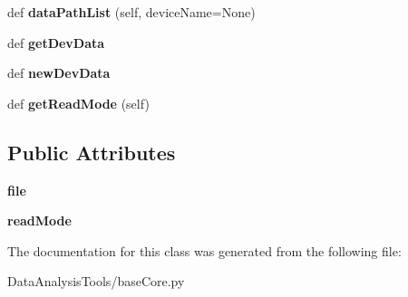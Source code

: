 \begin{DoxyCompactItemize}
def {\bfseries data\+Path\+List} (self, device\+Name=None)
\item 
\mbox{\label{classMIS_1_1DataAnalysisTools_1_1baseCore_1_1LUMISData_a1e463d053cda8f745f1fefe394a772c4}} 
def {\bfseries get\+Dev\+Data}
\item 
\mbox{\label{classMIS_1_1DataAnalysisTools_1_1baseCore_1_1LUMISData_a9e28f88167eb0230f6fe7286c44f43d2}} 
def {\bfseries new\+Dev\+Data}
\item 
\mbox{\label{classMIS_1_1DataAnalysisTools_1_1baseCore_1_1LUMISData_aca52156ce8295f42899aeff2370f0341}} 
def {\bfseries get\+Read\+Mode} (self)
\end{DoxyCompactItemize}
\subsection*{Public Attributes}
\begin{DoxyCompactItemize}
\item 
\mbox{\label{classMIS_1_1DataAnalysisTools_1_1baseCore_1_1LUMISData_a07e27b381b26f5d49a42a0459f4d0b25}} 
{\bfseries file}
\item 
\mbox{\label{classMIS_1_1DataAnalysisTools_1_1baseCore_1_1LUMISData_a364ceb3ca21e43b9b8fba18fd7f1455a}} 
{\bfseries read\+Mode}
\end{DoxyCompactItemize}


The documentation for this class was generated from the following file\+:\begin{DoxyCompactItemize}
\item 
Data\+Analysis\+Tools/base\+Core.\+py\end{DoxyCompactItemize}
